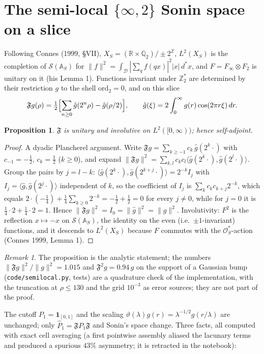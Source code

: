 \documentclass[11pt]{article}
\newtheorem{proposition}{Proposition}\theoremstyle{remark}\newtheorem*{remark}{Remark}
\begin{document}
\section{The semi-local $\{\infty,2\}$ Sonin space on a slice}
Following Connes (1999, \S VII), $X_S=(\mathbb R\times\mathbb Q_2)/\pm2^{\mathbb Z}$, $L^2(X_S)$ is the completion of $\mathcal S(\mathbb A_S)$ for $\|f\|^2=\int_{\mathcal D}|\sum_q f(qx)|^2|x|\,d^*x$, and $F=F_\infty\otimes F_2$ is unitary on it (his Lemma 1). Functions invariant under $\mathbb Z_2^*$ are determined by their restriction $g$ to the shell $\mathrm{ord}_2=0$, and on this slice
\begin{equation}\label{F}
\mathfrak Fg(\rho)=\tfrac12\Bigl[\sum_{n\ge0}\hat g(2^n\rho)-\hat g(\rho/2)\Bigr],\qquad \hat g(\xi)=2\int_0^\infty g(r)\cos(2\pi r\xi)\,dr .
\end{equation}
\begin{proposition}
$\mathfrak F$ is unitary and involutive on $L^2([0,\infty))$; hence self-adjoint.
\end{proposition}
\begin{proof}
A dyadic Plancherel argument. Write $\mathfrak Fg=\sum_{k\ge-1}c_k\,\hat g(2^k\cdot)$ with $c_{-1}=-\tfrac12$, $c_k=\tfrac12$ ($k\ge0$), and expand $\|\mathfrak Fg\|^2=\sum_{k,l}c_kc_l\langle\hat g(2^k\cdot),\hat g(2^l\cdot)\rangle$. Group the pairs by $j=l-k$: $\langle\hat g(2^k\cdot),\hat g(2^{k+j}\cdot)\rangle=2^{-k}I_j$ with $I_j=\langle\hat g,\hat g(2^j\cdot)\rangle$ independent of $k$, so the coefficient of $I_j$ is $\sum_kc_kc_{k+j}2^{-k}$, which equals $2\cdot(-\tfrac14)+\tfrac14\sum_{k\ge0}2^{-k}=-\tfrac12+\tfrac12=0$ for every $j\ne0$, while for $j=0$ it is $\tfrac14\cdot2+\tfrac14\cdot2=1$. Hence $\|\mathfrak Fg\|^2=I_0=\|\hat g\|^2=\|g\|^2$. Involutivity: $F^2$ is the reflection $x\mapsto-x$ on $\mathcal S(\mathbb A_S)$, the identity on the even (i.e.\ $\pm1$-invariant) functions, and it descends to $L^2(X_S)$ because $F$ commutes with the $\mathcal O_S^*$-action (Connes 1999, Lemma 1).
\end{proof}
\begin{remark}
The proposition is the analytic statement; the numbers $\|\mathfrak Fg\|^2/\|g\|^2=1.015$ and $\mathfrak F^2g=0.94\,g$ on the support of a Gaussian bump (\texttt{code/semilocal.py}, tests) are a quadrature check of the implementation, with the truncation at $\rho\le130$ and the grid $10^{-3}$ as error sources; they are not part of the proof.
\end{remark}
The cutoff $P_1=\mathbf 1_{[0,1]}$ and the scaling $\vartheta(\lambda)g(r)=\lambda^{-1/2}g(r/\lambda)$ are unchanged; only $\hat P_1=\mathfrak FP_1\mathfrak F$ and Sonin's space change. Three facts, all computed with exact cell averaging (a first pointwise assembly aliased the lacunary terms and produced a spurious $43\%$ asymmetry; it is retracted in the notebook):
\end{document}
